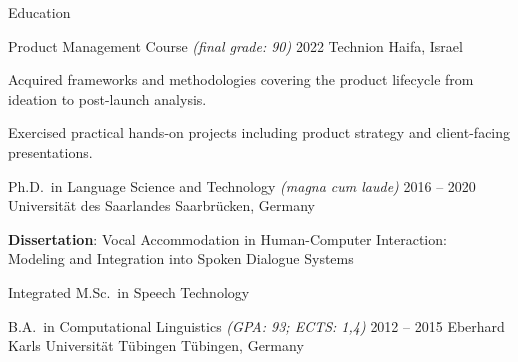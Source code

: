 \documentclass{resume} %
\begin{document}
\begin{rSection}{Education}

\begin{rSubsection}
	{Product Management Course \footnotesize{\textit{(final grade: 90)}}}
	{2022}
	{Technion}
	{Haifa, Israel}
	
	\setlength{\itemindent}{.5cm}
	
	\item Acquired frameworks and methodologies covering the product lifecycle from ideation to post-launch analysis.
	\item Exercised practical hands-on projects including product strategy and client-facing presentations.
\end{rSubsection}

\begin{rSubsection}
	{Ph.D.\ in Language Science and Technology \footnotesize{\textit{(magna cum laude)}}}
	{2016 -- 2020}
	{Universität des Saarlandes}
	{Saarbrücken, Germany}
	
	\setlength{\itemindent}{.5cm}
		
	\item \textbf{Dissertation}: Vocal Accommodation in Human-Computer Interaction:\\\hspace*{2.9cm}Modeling and Integration into Spoken Dialogue Systems %
	\item Integrated M.Sc.\ in Speech Technology
\end{rSubsection}

%	
%	

\begin{rSubsection}
	{B.A.\ in Computational Linguistics \footnotesize{\textit{(GPA: 93; ECTS: 1,4)}}}
	{2012 -- 2015}
	{Eberhard Karls Universität Tübingen}
	{Tübingen, Germany}

	\setlength{\itemindent}{.5cm}
	

\end{rSubsection}
\end{rSection}
\end{document}
